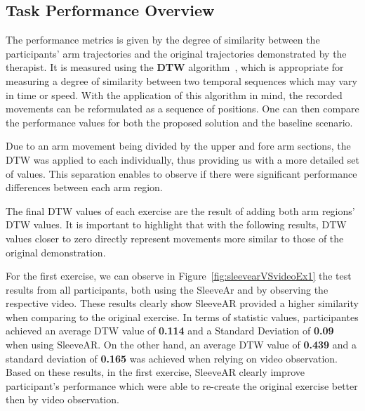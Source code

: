\begin{table}[!t]
\centering
{}
\caption{Widgets Questionnaire}
\label{table:widgets}
\end{table}

\subsection{Task Performance Overview}


The performance metrics is given by the degree of similarity between the participants' arm trajectories and the original trajectories demonstrated by the therapist. 
It is measured using the \textbf{\ac{DTW}} algorithm~\cite{kruskal1983symmetric}, which is appropriate for measuring a degree of similarity between two temporal sequences which may vary in time or speed. 
With the application of this algorithm in mind, the recorded movements can be reformulated as a sequence of positions. One can then compare the performance values for both the proposed solution and the baseline scenario.

Due to an arm movement being divided by the upper and fore arm sections, the \ac{DTW} was applied to each individually, thus providing us with a more detailed set of values. This separation enables to observe if there were significant performance differences between each arm region.

The final \ac{DTW} values of each exercise are the result of adding both arm regions' DTW values. It is important to highlight that with the following results, DTW values closer to zero directly represent movements more similar to those of the original demonstration.

For the first exercise, we can observe in Figure~\ref{fig:sleevearVSvideoEx1} the test results from all participants, both using the SleeveAr and by observing the respective video.
These results clearly show SleeveAR provided a higher similarity when comparing to the original exercise. 
In terms of statistic values, participantes achieved an average \ac{DTW} value of \textbf{0.114} and a Standard Deviation of \textbf{0.09} when using SleeveAR.
On the other hand, an average \ac{DTW} value of \textbf{0.439} and a standard deviation of \textbf{0.165} was achieved when relying on video observation. 
Based on these results, in the first exercise, SleeveAR clearly improve participant's performance which were able to re-create the original exercise better then by video observation. 

